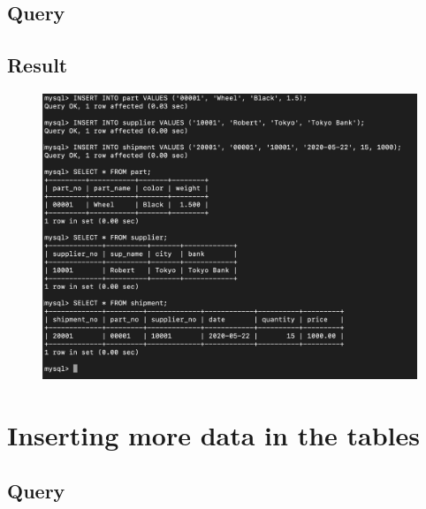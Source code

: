 \documentclass[12pt]{article}
\begin{document}
\subsection{Query}

\subsection{Result}
\begin{figure}[!hbt]
    \centering
    \includegraphics[scale=0.55]{screenshots/3.png}
    \label{fig:my_label1}
\end{figure}

\newpage

\section{Inserting more data in the tables}

\subsection{Query}
\newpage
\end{document}

